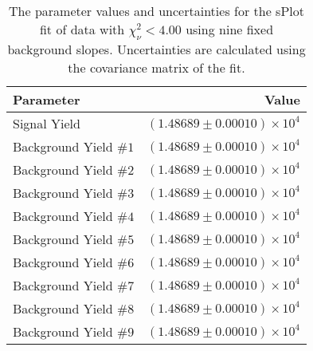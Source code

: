 
\begin{table}[ht]
    \begin{center}
        \begin{tabular}{lr}\toprule
            Parameter & Value \\\midrule
            Signal Yield & $(1.48689 \pm 0.00010) \times 10^{4}$ \\
            Background Yield $\#1$ & $(1.48689 \pm 0.00010) \times 10^{4}$ \\
            Background Yield $\#2$ & $(1.48689 \pm 0.00010) \times 10^{4}$ \\
            Background Yield $\#3$ & $(1.48689 \pm 0.00010) \times 10^{4}$ \\
            Background Yield $\#4$ & $(1.48689 \pm 0.00010) \times 10^{4}$ \\
            Background Yield $\#5$ & $(1.48689 \pm 0.00010) \times 10^{4}$ \\
            Background Yield $\#6$ & $(1.48689 \pm 0.00010) \times 10^{4}$ \\
            Background Yield $\#7$ & $(1.48689 \pm 0.00010) \times 10^{4}$ \\
            Background Yield $\#8$ & $(1.48689 \pm 0.00010) \times 10^{4}$ \\
            Background Yield $\#9$ & $(1.48689 \pm 0.00010) \times 10^{4}$ \\\bottomrule
        \end{tabular}
        \caption{The parameter values and uncertainties for the sPlot fit of data with $\chi^2_\nu < 4.00$ using nine fixed background slopes. Uncertainties are calculated using the covariance matrix of the fit.}\label{tab:splot-fit-results-chisqdof-4.00-fixed-9}
    \end{center}
\end{table}

